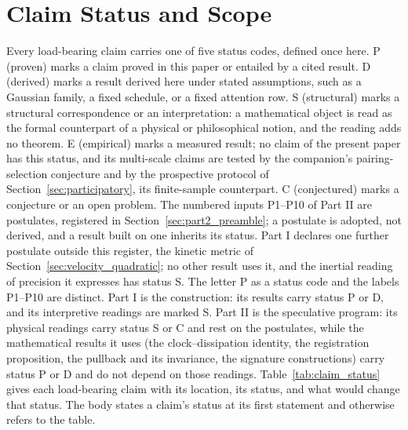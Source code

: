 \documentclass[11pt]{article}
\begin{document}
\section{Claim Status and Scope}\label{sec:epistemic_status}

Every load-bearing claim carries one of five status codes, defined once here. P (proven) marks a claim proved in this paper or entailed by a cited result. D (derived) marks a result derived here under stated assumptions, such as a Gaussian family, a fixed schedule, or a fixed attention row. S (structural) marks a structural correspondence or an interpretation: a mathematical object is read as the formal counterpart of a physical or philosophical notion, and the reading adds no theorem. E (empirical) marks a measured result; no claim of the present paper has this status, and its multi-scale claims are tested by the companion's pairing-selection conjecture and by the prospective protocol of Section~\ref{sec:participatory}, its finite-sample counterpart. C (conjectured) marks a conjecture or an open problem. The numbered inputs P1--P10 of Part II are postulates, registered in Section~\ref{sec:part2_preamble}; a postulate is adopted, not derived, and a result built on one inherits its status. Part I declares one further postulate outside this register, the kinetic metric of Section~\ref{sec:velocity_quadratic}; no other result uses it, and the inertial reading of precision it expresses has status S. The letter P as a status code and the labels P1--P10 are distinct. Part I is the construction: its results carry status P or D, and its interpretive readings are marked S. Part II is the speculative program: its physical readings carry status S or C and rest on the postulates, while the mathematical results it uses (the clock--dissipation identity, the registration proposition, the pullback and its invariance, the signature constructions) carry status P or D and do not depend on those readings. Table~\ref{tab:claim_status} gives each load-bearing claim with its location, its status, and what would change that status. The body states a claim's status at its first statement and otherwise refers to the table.
\end{document}
